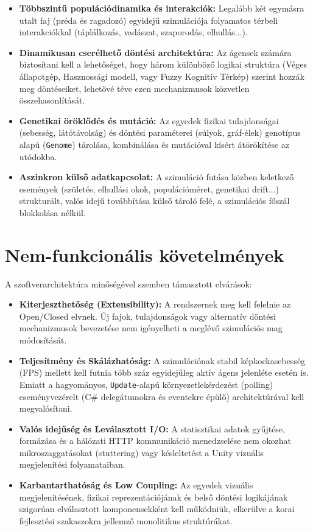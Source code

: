 \begin{itemize}
    \item \textbf{Többszintű populációdinamika és interakciók:} Legalább két egymásra utalt faj (préda és ragadozó) egyidejű szimulációja folyamatos térbeli interakciókkal (táplálkozás, vadászat, szaporodás, elhullás...).
    \item \textbf{Dinamikusan cserélhető döntési architektúra:} Az ágensek számára biztosítani kell a lehetőséget, hogy három különböző logikai struktúra (Véges állapotgép, Hasznossági modell, vagy Fuzzy Kognitív Térkép) szerint hozzák meg döntéseiket, lehetővé téve ezen mechanizmusok közvetlen összehasonlítását.
    \item \textbf{Genetikai öröklődés és mutáció:} Az egyedek fizikai tulajdonságai (sebesség, látótávolság) és döntési paraméterei (súlyok, gráf-élek) genotípus alapú (\texttt{Genome}) tárolása, kombinálása és mutációval kísért átörökítése az utódokba.
    \item \textbf{Aszinkron külső adatkapcsolat:} A szimuláció futása közben keletkező események (születés, elhullási okok, populációméret, genetikai drift...) strukturált, valós idejű továbbítása külső tároló felé, a szimulációs főszál blokkolása nélkül.
\end{itemize}

\section{Nem-funkcionális követelmények}

A szoftverarchitektúra minőségével szemben támasztott elvárások:

\begin{itemize}
    \item \textbf{Kiterjeszthetőség (Extensibility):} A rendszernek meg kell felelnie az Open/Closed elvnek. Új fajok, tulajdonságok vagy alternatív döntési mechanizmusok bevezetése nem igényelheti a meglévő szimulációs mag módosítását.
    \item \textbf{Teljesítmény és Skálázhatóság:} A szimulációnak stabil képkockasebesség (FPS) mellett kell futnia több száz egyidejűleg aktív ágens jelenléte esetén is. Emiatt a hagyományos, \texttt{Update}-alapú környezetlekérdezést (polling) eseményvezérelt (C\# delegátumokra és eventekre épülő) architektúrával kell megvalósítani.
    \item \textbf{Valós idejűség és Leválasztott I/O:} A statisztikai adatok gyűjtése, formázása és a hálózati HTTP kommunikáció menedzselése nem okozhat mikroszaggatásokat (stuttering) vagy késleltetést a Unity vizuális megjelenítési folyamataiban.
    \item \textbf{Karbantarthatóság és Low Coupling:} Az egyedek vizuális megjelenítésének, fizikai reprezentációjának és belső döntési logikájának szigorúan elválasztott komponensekként kell működniük, elkerülve a korai fejlesztési szakaszokra jellemző monolitikus struktúrákat.
\end{itemize}

